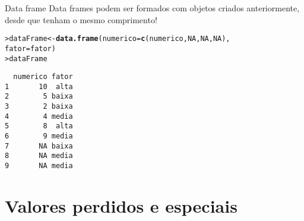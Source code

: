 \documentclass[10pt,handout]{beamer}\usepackage{graphicx, color}
\makeatletter
\newcommand{\hlfunctioncall}[1]{\textcolor[rgb]{0,0,0.545098039215686}{\textbf{#1}}}%
\newenvironment{kframe}{%
 \def\at@end@of@kframe{}%
 \ifinner\ifhmode%
  \def\at@end@of@kframe{\end{minipage}}%
  \begin{minipage}{\columnwidth}%
 \fi\fi%
 \def\FrameCommand##1{\hskip\@totalleftmargin \hskip-\fboxsep
 \colorbox{shadecolor}{##1}\hskip-\fboxsep
     \hskip-\linewidth \hskip-\@totalleftmargin \hskip\columnwidth}%
 \MakeFramed {\advance\hsize-\width
   \@totalleftmargin\z@ \linewidth\hsize
   \@setminipage}}%
 {\par\unskip\endMakeFramed%
 \at@end@of@kframe}
\newenvironment{knitrout}{}{} %
\makeatother
\begin{document}
\begin{frame}[fragile=singleslide]{Data frame}
Data frames podem ser formados com objetos criados anteriormente, desde
que tenham o mesmo comprimento!
\begin{knitrout}\small
{}\color{fgcolor}\begin{kframe}
\begin{alltt}
> dataFrame <- \hlfunctioncall{data.frame}(numerico = \hlfunctioncall{c}(numerico, NA, NA, NA),
                          fator = fator)
> dataFrame
\end{alltt}
\begin{verbatim}
  numerico fator
1       10  alta
2        5 baixa
3        2 baixa
4        4 media
5        8  alta
6        9 media
7       NA baixa
8       NA media
9       NA media
\end{verbatim}
\end{kframe}
\end{knitrout}

\end{frame}

\section[Valores perdidos]{Valores perdidos e especiais}
\end{document}
